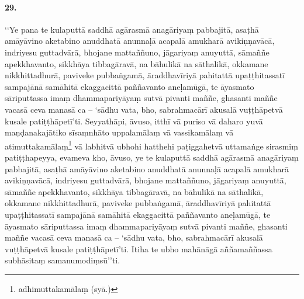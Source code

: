 \paragraph{29.} ‘‘Ye pana te kulaputtā saddhā agārasmā anagāriyaṃ pabbajitā, asaṭhā amāyāvino aketabino anuddhatā anunnaḷā acapalā amukharā avikiṇṇavācā, indriyesu guttadvārā, bhojane mattaññuno, jāgariyaṃ anuyuttā, sāmaññe apekkhavanto, sikkhāya tibbagāravā, na bāhulikā na sāthalikā, okkamane nikkhittadhurā, paviveke pubbaṅgamā, āraddhavīriyā pahitattā upaṭṭhitassatī sampajānā samāhitā ekaggacittā paññavanto aneḷamūgā, te āyasmato sāriputtassa imaṃ dhammapariyāyaṃ sutvā pivanti maññe, ghasanti maññe vacasā ceva manasā ca – ‘sādhu vata, bho, sabrahmacārī akusalā vuṭṭhāpetvā kusale patiṭṭhāpetī’ti. Seyyathāpi, āvuso, itthī vā puriso vā daharo yuvā maṇḍanakajātiko sīsaṃnhāto uppalamālaṃ vā vassikamālaṃ vā atimuttakamālaṃ\footnote{adhimuttakamālaṃ (syā.)} vā labhitvā ubhohi hatthehi paṭiggahetvā uttamaṅge sirasmiṃ patiṭṭhapeyya, evameva kho, āvuso, ye te kulaputtā saddhā agārasmā anagāriyaṃ pabbajitā, asaṭhā amāyāvino aketabino anuddhatā anunnaḷā acapalā amukharā avikiṇṇavācā, indriyesu guttadvārā, bhojane mattaññuno, jāgariyaṃ anuyuttā, sāmaññe apekkhavanto, sikkhāya tibbagāravā, na bāhulikā na sāthalikā, okkamane nikkhittadhurā, paviveke pubbaṅgamā, āraddhavīriyā pahitattā upaṭṭhitassatī sampajānā samāhitā ekaggacittā paññavanto aneḷamūgā, te āyasmato sāriputtassa imaṃ dhammapariyāyaṃ sutvā pivanti maññe, ghasanti maññe vacasā ceva manasā ca – ‘sādhu vata, bho, sabrahmacārī akusalā vuṭṭhāpetvā kusale patiṭṭhāpetī’ti. Itiha te ubho mahānāgā aññamaññassa subhāsitaṃ samanumodiṃsū’’ti.

